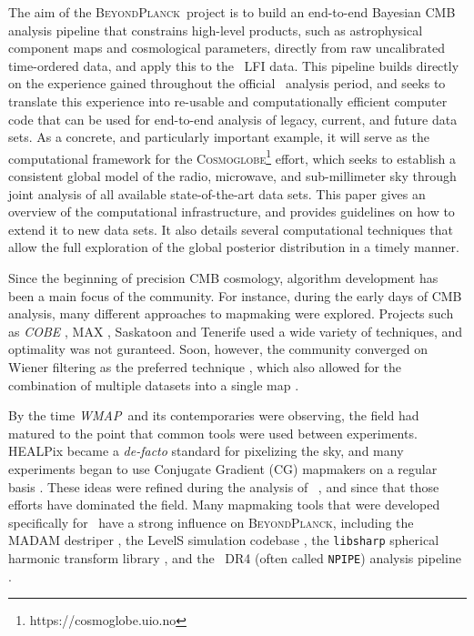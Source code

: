 \documentclass[twocolumn]{aa}
\def\WMAP{\emph{WMAP}}
\newcommand{\BP}{\textsc{BeyondPlanck}}
\newcommand{\npipe}[0]{\texttt{NPIPE}}
\begin{document}
The aim of the \BP\ project \citep{BP01} is to build an end-to-end
Bayesian CMB analysis pipeline that constrains high-level products,
such as astrophysical component maps and cosmological parameters,
directly from raw uncalibrated time-ordered data, and apply this to
the \Planck\ LFI data. This pipeline builds directly on the experience
gained throughout the official \Planck\ analysis period, and seeks to
translate this experience into re-usable and computationally efficient
computer code that can be used for end-to-end analysis of legacy,
current, and future data sets. As a concrete, and particularly
important example, it will serve as the computational framework for
the \textsc{Cosmoglobe}\footnote{https://cosmoglobe.uio.no} effort,
which seeks to establish a consistent global model of the radio,
microwave, and sub-millimeter sky through joint analysis of all
available state-of-the-art data sets. This paper gives an overview of
the computational infrastructure, and provides guidelines on how to
extend it to new data sets. It also details several computational
techniques that allow the full exploration of the global posterior distribution
in a timely manner.

Since the beginning of precision CMB cosmology, algorithm development
has been a main focus of the community. For instance, during the early
days of CMB analysis, many different approaches to mapmaking were
explored. Projects such as \emph{COBE} \citep{cobe1,cobe2}, MAX
\citep{max}, Saskatoon \citep{saskatoon} and Tenerife \citep{tenerife}
used a wide variety of techniques, and optimality was not
guranteed. Soon, however, the community converged on Wiener filtering
as the preferred technique \citep{tegmark}, which also allowed for the
combination of multiple datasets into a single map
\citep{CobeCombined}.

By the time \WMAP\ and its contemporaries were observing, the field
had matured to the point that common tools were used between
experiments. HEALPix \citep{healpix} became a \emph{de-facto} standard
for pixelizing the sky, and many experiments began to use Conjugate
Gradient (CG) mapmakers on a regular basis \cite[e.g.,][]{wmap}. These
ideas were refined during the analysis of
\Planck\ \citep{planck2013-p01,planck2014-a01,planck2016-l01}, and
since that those efforts have dominated the field. Many mapmaking
tools that were developed specifically for \Planck\ have a strong
influence on \BP, including the MADAM destriper \citep{madam}, the
LevelS simulation codebase \citep{LevelS}, the \texttt{libsharp} spherical
harmonic transform library \citep{libsharp}, and the \Planck\ DR4
(often called \npipe) analysis
pipeline \cite{npipe}.
\end{document}
